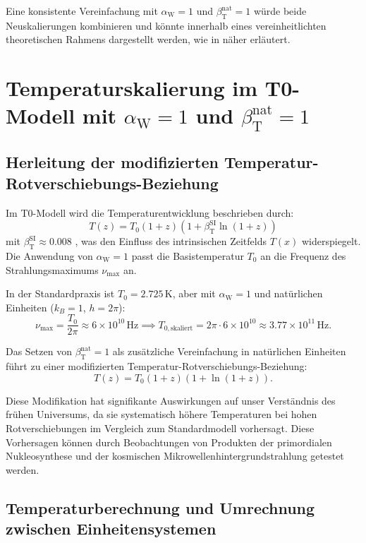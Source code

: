 \documentclass[12pt,a4paper]{article}
\newcommand{\Tfield}{T(x)}
\newcommand{\betaT}{\beta_{\text{T}}}
\newcommand{\alphaW}{\alpha_{\text{W}}}
\begin{document}
	Eine konsistente Vereinfachung mit \(\alphaW = 1\) und \(\betaT^{\text{nat}} = 1\) würde beide Neuskalierungen kombinieren und könnte innerhalb eines vereinheitlichten theoretischen Rahmens dargestellt werden, wie in \cite{pascher_alphabeta_2025} näher erläutert.
	
	\section{Temperaturskalierung im T0-Modell mit \(\alphaW = 1\) und \(\betaT^{\text{nat}} = 1\)}
	\label{sec:temperature_scaling}
	
	\subsection{Herleitung der modifizierten Temperatur-Rotverschiebungs-Beziehung}
	\label{subsec:modified_temp_redshift}
	
	Im T0-Modell wird die Temperaturentwicklung beschrieben durch:
	\begin{equation}
		T(z) = T_0 (1 + z) (1 + \betaT^{\text{SI}} \ln(1 + z))
	\end{equation}
	mit \(\betaT^{\text{SI}} \approx 0.008\) \cite{pascher_messdifferenzen_2025}, was den Einfluss des intrinsischen Zeitfelds \(\Tfield\) widerspiegelt. Die Anwendung von \(\alphaW = 1\) passt die Basistemperatur \(T_0\) an die Frequenz des Strahlungsmaximums \(\nu_{\text{max}}\) an.
	
	In der Standardpraxis ist \(T_0 = 2.725 \, \text{K}\), aber mit \(\alphaW = 1\) und natürlichen Einheiten (\(k_B = 1\), \(h = 2\pi\)):
	\[
	\nu_{\text{max}} = \frac{T_0}{2\pi} \approx 6 \times 10^{10} \, \text{Hz} \implies T_{0,\text{skaliert}} = 2\pi \cdot 6 \times 10^{10} \approx 3.77 \times 10^{11} \, \text{Hz}.
	\]
	
	Das Setzen von \(\betaT^{\text{nat}} = 1\) als zusätzliche Vereinfachung in natürlichen Einheiten führt zu einer modifizierten Temperatur-Rotverschiebungs-Beziehung:
	\[
	T(z) = T_0 (1 + z) (1 + \ln(1 + z)).
	\]
	
	Diese Modifikation hat signifikante Auswirkungen auf unser Verständnis des frühen Universums, da sie systematisch höhere Temperaturen bei hohen Rotverschiebungen im Vergleich zum Standardmodell vorhersagt. Diese Vorhersagen können durch Beobachtungen von Produkten der primordialen Nukleosynthese und der kosmischen Mikrowellenhintergrundstrahlung getestet werden.
	
	\subsection{Temperaturberechnung und Umrechnung zwischen Einheitensystemen}
	\label{subsec:temp_calculation}
	
\end{document}
